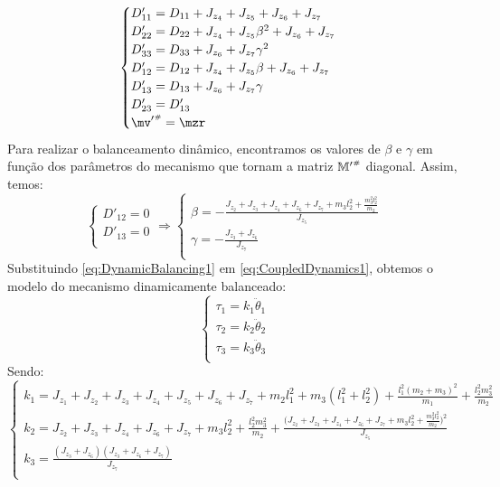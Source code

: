 \documentclass[a4paper,11pt,brazil,fleqn]{article}
\begin{document}
\begin{equation}\label{eq:CoupledDynamics1}
\begin{cases}
D'_{11} = D_{11} + J_{z_4} + J_{z_5} + J_{z_6} + J_{z_7} \\
D'_{22} = D_{22} + J_{z_4} + J_{z_5} \beta^2 + J_{z_6} + J_{z_7} \\
D'_{33} = D_{33} + J_{z_6} + J_{z_7} \gamma^2 \\
D'_{12} = D_{12} + J_{z_4} + J_{z_5} \beta + J_{z_6} + J_{z_7} \\
D'_{13} = D_{13} + J_{z_6} + J_{z_7} \gamma  \\
D'_{23} = D'_{13}\\
{\mv'}\ssh = \mzr \\
\end{cases}
\end{equation}
Para realizar o balanceamento din\^{a}mico, encontramos os valores de $\beta$ e $\gamma$ em fun\c{c}\~{a}o dos par\^ametros do mecanismo que tornam a matriz ${\mathbb{M}'}^{\scriptscriptstyle \#}$ diagonal. Assim, temos:
\begin{equation}\label{eq:DynamicBalancing1}
\begin{cases}
D'_{12} = 0 \\
D'_{13} = 0 \\
\end{cases}
\Rightarrow
\begin{cases}
\beta = -\frac{J_{z_2} + J_{z_3} + J_{z_4} + J_{z_6} + J_{z_7} + m_3 l_2^2 + \frac{m_3^2 l_2^2}{m_2}}{J_{z_5}} \\
\gamma = -\frac{J_{z_3} + J_{z_6}}{J_{z_7}} \\
\end{cases}
\end{equation}
Substituindo \eqref{eq:DynamicBalancing1} em \eqref{eq:CoupledDynamics1}, obtemos o modelo do mecanismo dinamicamente balanceado:
\begin{equation}\label{eq:DynamicBalanced1}
\begin{cases}
\tau_1 = k_1 \ddot{\theta}_1 \\
\tau_2 = k_2 \ddot{\theta}_2 \\
\tau_3 = k_3 \ddot{\theta}_3 \\
\end{cases}
\end{equation}
Sendo:
\begin{equation}\label{eq:DynamicBalancedKs1}
\begin{cases}
k_1 = J_{z_1} + J_{z_2} + J_{z_3} + J_{z_4} + J_{z_5} + J_{z_6} + J_{z_7} + m_2 l_1^2 + m_3 (l_1^2 + l_2^2) + \frac{l_1^2 (m_2 + m_3)^2}{m_1} + \frac{l_2^2 m_3^2}{m_2} \\
k_2 = J_{z_2} + J_{z_3} + J_{z_4} + J_{z_6} + J_{z_7} + m_3 l_2^2 + \frac{l_2^2 m_3^2}{m_2} + \frac{\big(J_{z_2} + J_{z_3} + J_{z_4} + J_{z_6} + J_{z_7} + m_3 l_2^2 + \frac{m_3^2 l_2^2}{m_2}\big)^2}{J_{z_5}} \\
k_3 = \frac{(J_{z_3}+J_{z_6})(J_{z_3}+J_{z_6}+J_{z_7})}{J_{z_7}} \\
\end{cases}
\end{equation}
\end{document}
